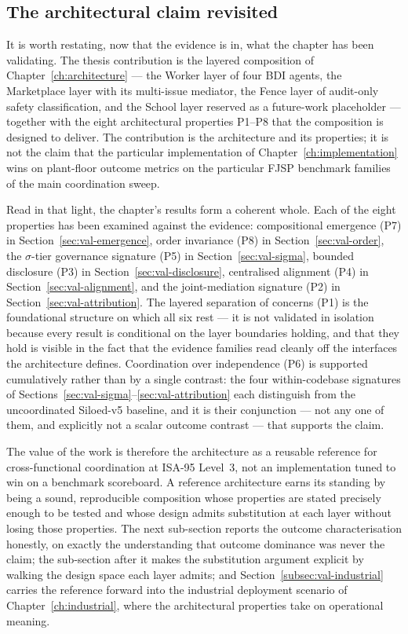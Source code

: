 \subsection{The architectural claim revisited}
\label{subsec:val-claim}

It is worth restating, now that the evidence is in, what the chapter
has been validating. The thesis contribution is the layered
composition of Chapter~\ref{ch:architecture} --- the Worker layer of
four BDI agents, the Marketplace layer with its multi-issue mediator,
the Fence layer of audit-only safety classification, and the School
layer reserved as a future-work placeholder --- together with the
eight architectural properties P1--P8 that the composition is
designed to deliver. The contribution is the architecture and its
properties; it is not the claim that the particular implementation of
Chapter~\ref{ch:implementation} wins on plant-floor outcome metrics
on the particular FJSP benchmark families of the main coordination
sweep.

Read in that light, the chapter's results form a coherent whole. Each
of the eight properties has been examined against the evidence:
compositional emergence (P7) in Section~\ref{sec:val-emergence},
order invariance (P8) in Section~\ref{sec:val-order}, the
$\sigma$-tier governance signature (P5) in
Section~\ref{sec:val-sigma}, bounded disclosure (P3) in
Section~\ref{sec:val-disclosure}, centralised alignment (P4) in
Section~\ref{sec:val-alignment}, and the joint-mediation signature
(P2) in Section~\ref{sec:val-attribution}. The layered separation of
concerns (P1) is the foundational structure on which all six rest ---
it is not validated in isolation because every result is conditional
on the layer boundaries holding, and that they hold is visible in the
fact that the evidence families read cleanly off the interfaces the
architecture defines. Coordination over independence (P6) is
supported cumulatively rather than by a single contrast: the four
within-codebase signatures of Sections~\ref{sec:val-sigma}--\ref{sec:val-attribution}
each distinguish \NEXUS{} from the uncoordinated Siloed-v5 baseline,
and it is their conjunction --- not any one of them, and explicitly
not a scalar outcome contrast --- that supports the claim.

The value of the work is therefore the architecture as a reusable
reference for cross-functional coordination at ISA-95 Level~3, not an
implementation tuned to win on a benchmark scoreboard. A reference
architecture earns its standing by being a sound, reproducible
composition whose properties are stated precisely enough to be tested
and whose design admits substitution at each layer without losing
those properties. The next sub-section reports the outcome
characterisation honestly, on exactly the understanding that outcome
dominance was never the claim; the sub-section after it makes the
substitution argument explicit by walking the design space each layer
admits; and Section~\ref{subsec:val-industrial} carries the reference
forward into the industrial deployment scenario of
Chapter~\ref{ch:industrial}, where the architectural properties take
on operational meaning.

